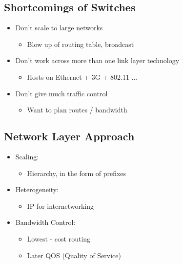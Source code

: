 \documentclass[12pt]{ctexart}   %
\begin{document}
	\subsection{Shortcomings of Switches}
	\begin{itemize}
		\item Don't scale to large networks
		\begin{itemize}
			\item Blow up of routing table, broadcast
		\end{itemize}
		
		\item Don't work across more than one link layer technology
		\begin{itemize}
			\item Hosts on Ethernet + 3G + 802.11 ...
		\end{itemize}
		
		\item Don't give much traffic control
		\begin{itemize}
			\item Want to plan routes / bandwidth
		\end{itemize}
	\end{itemize}
	
	\subsection{Network Layer Approach}
	\begin{itemize}
		\item Scaling:
		\begin{itemize}
			\item Hierarchy, in the form of prefixes
		\end{itemize}
		
		\item Heterogeneity:
		\begin{itemize}
			\item IP for internetworking
		\end{itemize}
		
		\item Bandwidth Control:
		\begin{itemize}
			\item Lowest - cost routing 
			\item Later QOS (Quality of Service)
		\end{itemize}
	\end{itemize}
	
\end{document}
